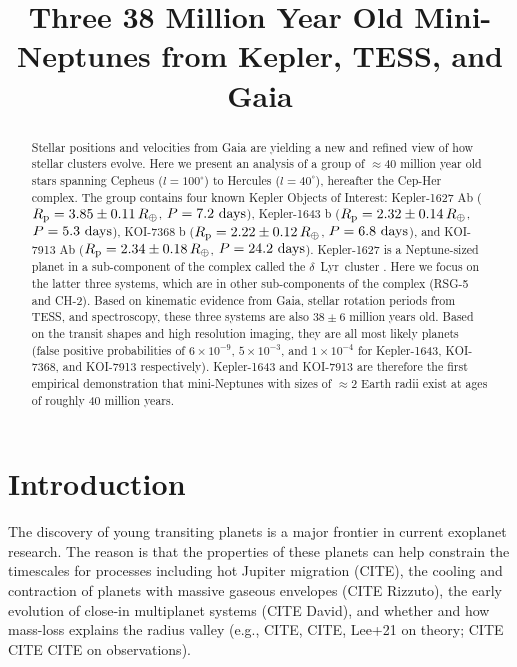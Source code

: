 \documentclass[12pt,twocolumn,linenumbers]{aastex63}
\begin{document}
\title{
  Three 38 Million Year Old Mini-Neptunes from Kepler, TESS, and Gaia
}



\begin{abstract}
  Stellar positions and velocities from Gaia are yielding a new and
  refined view of how stellar clusters evolve.
  Here we present an analysis of a group of $\approx$40 million
  year old stars spanning Cepheus ($l=100^\circ$) to Hercules
  ($l=40^\circ$), hereafter the Cep-Her complex.  The group contains
  four known Kepler Objects of Interest:
  Kepler-1627 Ab ($R_{\rm p} = 3.85 \pm 0.11\,R_\oplus$, $P = 7.2\ {\rm days}$),
  Kepler-1643 b ($R_{\rm p} = 2.32 \pm 0.14\,R_\oplus$, $P = 5.3\ {\rm days}$),
  KOI-7368 b ($R_{\rm p} = 2.22 \pm 0.12\,R_\oplus$, $P = 6.8\ {\rm days}$), and
  KOI-7913 Ab ($R_{\rm p} = 2.34 \pm 0.18\,R_\oplus$, $P = 24.2\ {\rm days}$).
  Kepler-1627 is a Neptune-sized planet in a sub-component of the
  complex called the $\delta$\ Lyr\ cluster
  \citep{bouma_kep1627_2022}.  Here we focus on the latter three
  systems, which are in other sub-components of the complex (RSG-5 and
  CH-2).  Based on kinematic evidence from Gaia, stellar rotation
  periods from TESS, and spectroscopy, these three systems are also
  $38 \pm 6$ million years old.  Based on the transit shapes and high
  resolution imaging, they are all most
  likely planets (false positive probabilities of $6\times10^{-9}$,
  $5\times10^{-3}$, and $1\times10^{-4}$ for Kepler-1643, KOI-7368,
  and KOI-7913 respectively).  Kepler-1643 and KOI-7913 are therefore
  the first empirical demonstration that mini-Neptunes with sizes of
  $\approx$2 Earth radii exist at ages of roughly 40 million years.
\end{abstract}





\section{Introduction}

The discovery of young transiting planets is a major frontier in
current exoplanet research.  The reason is that the properties of
these planets can help constrain the timescales for processes
including hot Jupiter migration (CITE), the cooling and contraction of
planets with massive gaseous envelopes (CITE Rizzuto), the early
evolution of close-in multiplanet systems (CITE David), and whether
and how mass-loss explains the radius valley (e.g., CITE, CITE, Lee+21
on theory; CITE CITE CITE on observations).
\end{document}
